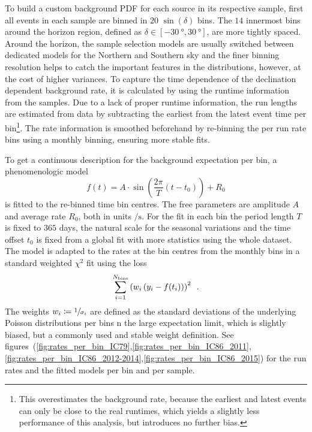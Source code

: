 To build a custom background PDF for each source in its respective sample, first all events in each sample are binned in $\num{20}$ $\sin(\delta)$ bins.
The $\num{14}$ innermost bins around the horizon region, defined as $\delta\in[\SI{-30}{\degree}, \SI{30}{\degree}]$, are more tightly spaced.
Around the horizon, the sample selection models are usually switched between dedicated models for the Northern and Southern sky and the finer binning resolution helps to catch the important features in the distributions, however, at the cost of higher variances.
To capture the time dependence of the declination dependent background rate, it is calculated by using the runtime information from the samples.
Due to a lack of proper runtime information, the run lengths are estimated from data by subtracting the earliest from the latest event time per bin\footnote{This overestimates the background rate, because the earliest and latest events can only be close to the real runtimes, which yields a slightly less performance of this analysis, but introduces no further bias.}.
The rate information is smoothed beforehand by re-binning the per run rate bins using a monthly binning, ensuring more stable fits.

To get a continuous description for the background expectation per bin, a phenomenologic model
\begin{equation}
  \label{equ:rate_model}
  f(t)
  = A\cdot
    \sin\left(\frac{2\pi}{T}\left(t - t_0\right)\right) + R_0
\end{equation}
is fitted to the re-binned time bin centres.
The free parameters are amplitude $A$ and average rate $R_0$, both in units $\si{\per\s}$.
For the fit in each bin the period length $T$ is fixed to $365$ days, the natural scale for the seasonal variations and the time offset $t_0$ is fixed from a global fit with more statistics using the whole dataset.
The model is adapted to the rates at the bin centres from the monthly bins in a standard weighted $\chi^2$ fit using the loss
\begin{equation}
  \sum_{i=1}^{N_\text{bins}} \left(w_i\left(y_i - f(t_i)\right)\right)^2
  \enspace\text{.}
\end{equation}
The weights $w_i\coloneqq\sfrac{1}{\sigma_i}$ are defined as the standard deviations of the underlying Poisson distributions per bins n the large expectation limit, which is slightly biased, but a commonly used and stable weight definition.
See figures~(\ref{fig:rates_per_bin_IC79},\ref{fig:rates_per_bin_IC86_2011},\ref{fig:rates_per_bin_IC86_2012-2014},\ref{fig:rates_per_bin_IC86_2015}) for the run rates and the fitted models per bin and per sample.

